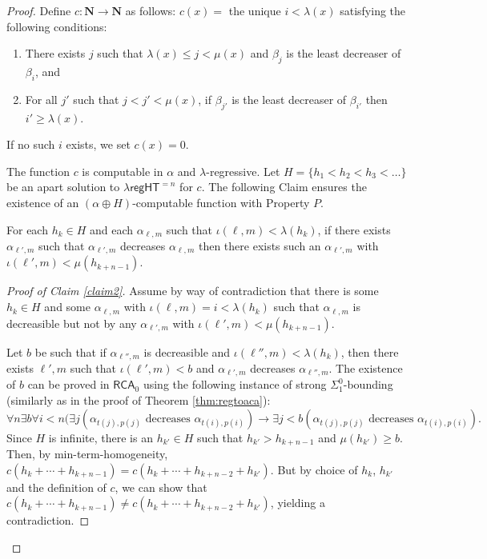 \documentclass[10pt,a4paper]{amsart}
\newcommand\Nat{\mathbf{N}}
\newcommand\RCA{\mathsf{RCA}}
\newcommand\regHT{\mathsf{regHT}}
\begin{document}
\begin{proof}
Define $c:\Nat\to \Nat$ as follows: $c(x)=$ the unique $i < \lambda(x)$ satisfying the following conditions:
\begin{enumerate}
\item There exists $j$ such that $\lambda(x) \leq j < \mu(x)$ and $\beta_j$ is the least decreaser of $\beta_i$, and 
\item For all $j'$ such that $j < j'  < \mu(x)$, if $\beta_{j'}$ is the least decreaser of $\beta_{i'}$ then $i' \geq \lambda(x)$. 
\end{enumerate}
If no such $i$ exists, we set $c(x)=0$.

The function $c$ is computable in $\alpha$ and $\lambda$-regressive. Let $H = \{ h_1 < h_2 < h_3 < \dots \}$ be an apart solution to $\lambda\regHT^{= n}$ for $c$. The following Claim ensures the existence of an $(\alpha \oplus H)$-computable function with Property $P$.

\begin{claim}\label{claim2} For each $h_k\in H$ and each $\alpha_{\ell,m}$ such that $\iota(\ell,m) < \lambda(h_k)$, if there exists $\alpha_{\ell',m}$ such that $\alpha_{\ell',m}$ decreases $\alpha_{\ell,m}$ then there exists such an $\alpha_{\ell',m}$ with $\iota(\ell',m)<\mu(h_{k+n-1})$.
\end{claim}

\begin{proof}[Proof of Claim \ref{claim2}]
Assume by way of contradiction that there is some $h_k \in H$ and some $\alpha_{\ell,m}$ with $\iota(\ell,m)=i < \lambda(h_k)$ such that $\alpha_{\ell,m}$ is decreasible but not by any $\alpha_{\ell',m}$ with $\iota(\ell',m) < \mu(h_{k+n-1})$. 

Let $b$ be such that if $\alpha_{\ell'',m}$ is decreasible and $\iota(\ell'',m) < \lambda(h_k)$, then there exists $\ell',m$ such that $\iota(\ell',m) < b$ and $\alpha_{\ell',m}$ decreases $\alpha_{\ell'',m}$. The existence of $b$ can be proved in $\RCA_0$ using the following instance of strong $\Sigma^0_1$-bounding (similarly as in the proof of Theorem \ref{thm:regtoaca}):
$$ \forall n \exists b \forall i < n ( \exists j (\alpha_{t(j),p(j)} \mbox{ decreases } \alpha_{t(i),p(i)}) \to \exists j < b (\alpha_{t(j),p(j)} \mbox{ decreases } \alpha_{t(i),p(i)}).$$
Since $H$ is infinite, there is an $h_{k'} \in H$ such that $h_{k'} > h_{k+n-1}$ and $\mu(h_{k'}) \geq b$. Then, by min-term-homogeneity, $c(h_k + \cdots + h_{k+n-1}) = c(h_k + \cdots + h_{k+n-2} + h_{k'})$. But by choice of $h_k$, $h_{k'}$ and the definition of $c$, we can show that $c(h_k + \cdots + h_{k+n-1}) \neq c(h_k + \cdots + h_{k+n-2} + h_{k'})$, 
yielding a contradiction.


\end{proof}
\end{proof}
\end{document}
